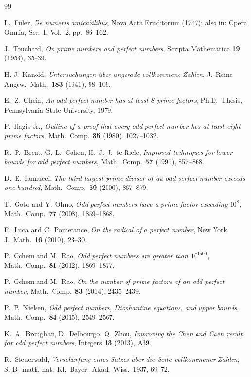 \documentclass[12pt,a4paper]{amsart}
\theoremstyle{definition}
\theoremstyle{remark}
\begin{document}
\begin{thebibliography}{99}

L.\ Euler,
\textit{De numeris amicabilibus},
Nova Acta Eruditorum (1747);
also in: Opera Omnia, Ser.\ I, Vol.\ 2, pp.\ 86--162.

J.\ Touchard,
\textit{On prime numbers and perfect numbers},
Scripta Mathematica \textbf{19} (1953), 35--39.

H.-J.\ Kanold,
\textit{Untersuchungen über ungerade vollkommene Zahlen},
J.\ Reine Angew.\ Math.\ \textbf{183} (1941), 98--109.

E.\ Z.\ Chein,
\textit{An odd perfect number has at least 8 prime factors},
Ph.D.\ Thesis, Pennsylvania State University, 1979.

P.\ Hagis Jr.,
\textit{Outline of a proof that every odd perfect number has at least eight
prime factors},
Math.\ Comp.\ \textbf{35} (1980), 1027--1032.

R.\ P.\ Brent, G.\ L.\ Cohen, H.\ J.\ J.\ te Riele,
\textit{Improved techniques for lower bounds for odd perfect numbers},
Math.\ Comp.\ \textbf{57} (1991), 857--868.

D.\ E.\ Iannucci,
\textit{The third largest prime divisor of an odd perfect number exceeds
one hundred},
Math.\ Comp.\ \textbf{69} (2000), 867--879.

T.\ Goto and Y.\ Ohno,
\textit{Odd perfect numbers have a prime factor exceeding $10^8$},
Math.\ Comp.\ \textbf{77} (2008), 1859--1868.

F.\ Luca and C.\ Pomerance,
\textit{On the radical of a perfect number},
New York J.\ Math.\ \textbf{16} (2010), 23--30.

P.\ Ochem and M.\ Rao,
\textit{Odd perfect numbers are greater than $10^{1500}$},
Math.\ Comp.\ \textbf{81} (2012), 1869--1877.

P.\ Ochem and M.\ Rao,
\textit{On the number of prime factors of an odd perfect number},
Math.\ Comp.\ \textbf{83} (2014), 2435--2439.

P.\ P.\ Nielsen,
\textit{Odd perfect numbers, Diophantine equations, and upper bounds},
Math.\ Comp.\ \textbf{84} (2015), 2549--2567.

K.\ A.\ Broughan, D.\ Delbourgo, Q.\ Zhou,
\textit{Improving the Chen and Chen result for odd perfect numbers},
Integers \textbf{13} (2013), A39.

R.\ Steuerwald,
\textit{Verschärfung eines Satzes über die Seite vollkommener Zahlen},
S.-B.\ math.-nat.\ Kl.\ Bayer.\ Akad.\ Wiss.\ 1937, 69--72.

\end{thebibliography}
\end{document}
